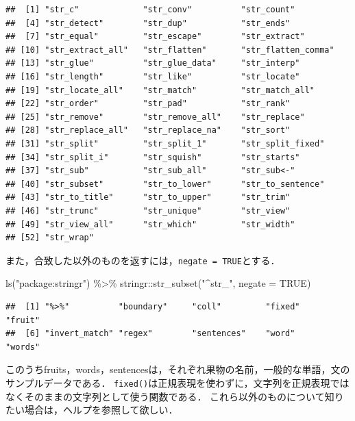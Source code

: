 \documentclass[
]{article}
\newenvironment{Shaded}{\begin{snugshade}}{\end{snugshade}}
\newcommand{\AttributeTok}[1]{\textcolor[rgb]{0.77,0.63,0.00}{#1}}
\newcommand{\ConstantTok}[1]{\textcolor[rgb]{0.00,0.00,0.00}{#1}}
\newcommand{\FunctionTok}[1]{\textcolor[rgb]{0.00,0.00,0.00}{#1}}
\newcommand{\NormalTok}[1]{#1}
\newcommand{\SpecialCharTok}[1]{\textcolor[rgb]{0.00,0.00,0.00}{#1}}
\newcommand{\StringTok}[1]{\textcolor[rgb]{0.31,0.60,0.02}{#1}}
\begin{document}
\begin{verbatim}
##  [1] "str_c"             "str_conv"          "str_count"        
##  [4] "str_detect"        "str_dup"           "str_ends"         
##  [7] "str_equal"         "str_escape"        "str_extract"      
## [10] "str_extract_all"   "str_flatten"       "str_flatten_comma"
## [13] "str_glue"          "str_glue_data"     "str_interp"       
## [16] "str_length"        "str_like"          "str_locate"       
## [19] "str_locate_all"    "str_match"         "str_match_all"    
## [22] "str_order"         "str_pad"           "str_rank"         
## [25] "str_remove"        "str_remove_all"    "str_replace"      
## [28] "str_replace_all"   "str_replace_na"    "str_sort"         
## [31] "str_split"         "str_split_1"       "str_split_fixed"  
## [34] "str_split_i"       "str_squish"        "str_starts"       
## [37] "str_sub"           "str_sub_all"       "str_sub<-"        
## [40] "str_subset"        "str_to_lower"      "str_to_sentence"  
## [43] "str_to_title"      "str_to_upper"      "str_trim"         
## [46] "str_trunc"         "str_unique"        "str_view"         
## [49] "str_view_all"      "str_which"         "str_width"        
## [52] "str_wrap"
\end{verbatim}

また，合致した以外のものを返すには，\texttt{negate\ =\ TRUE}とする．

\begin{Shaded}
\begin{Highlighting}[]
\FunctionTok{ls}\NormalTok{(}\StringTok{"package:stringr"}\NormalTok{) }\SpecialCharTok{\%\textgreater{}\%}
\NormalTok{  stringr}\SpecialCharTok{::}\FunctionTok{str\_subset}\NormalTok{(}\StringTok{"\^{}str\_"}\NormalTok{, }\AttributeTok{negate =} \ConstantTok{TRUE}\NormalTok{)}
\end{Highlighting}
\end{Shaded}

\begin{verbatim}
##  [1] "%>%"          "boundary"     "coll"         "fixed"        "fruit"       
##  [6] "invert_match" "regex"        "sentences"    "word"         "words"
\end{verbatim}

このうちfruits，words，sentencesは，それぞれ果物の名前，一般的な単語，文のサンプルデータである．
\texttt{fixed()}は正規表現を使わずに，文字列を正規表現ではなくそのままの文字列として使う関数である．
これら以外のものについて知りたい場合は，ヘルプを参照して欲しい．
\end{document}
